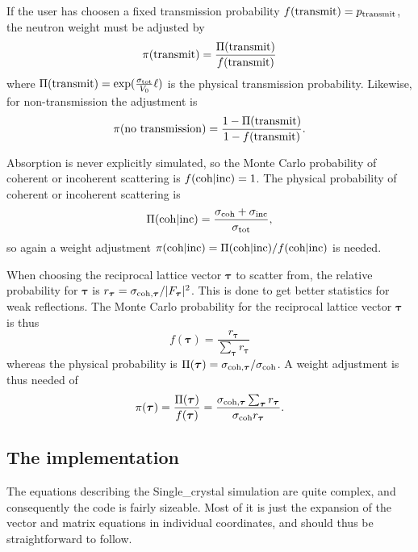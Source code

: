 If the user has choosen a fixed transmission probability $f({\rm
  transmit}) = p_{\rm transmit}$, the neutron weight must be adjusted by
$$ \pi({\rm transmit}) = \frac{\Pi({\rm transmit})}{f({\rm transmit})}
$$
where $\Pi({\rm transmit}) = \exp(\frac{\sigma_{\rm tot}}{V_0}\ell)$ is
the physical transmission probability. Likewise, for non-transmission
the adjustment is
$$ \pi({\rm no~transmission}) = \frac{1-\Pi({\rm transmit})}{1-f({\rm transmit})}.
$$

Absorption is never explicitly simulated, so the Monte Carlo probability
of coherent or incoherent scattering is $f({\rm coh}|{\rm inc}) =
1$. The physical probability of coherent or incoherent scattering is
$$ \Pi({\rm coh}|{\rm inc}) = \frac{\sigma_{\rm coh} + \sigma_{\rm
    inc}}{\sigma_{\rm tot}}, $$
so again a weight adjustment $\pi({\rm coh}|{\rm inc}) = \Pi({\rm
    coh}|{\rm inc})/f({\rm coh}|{\rm inc})$ is needed.

When choosing the reciprocal lattice vector $\boldsymbol{\tau}$ to
scatter from, the relative probability for $\boldsymbol{\tau}$ is
$r_{\boldsymbol{\tau}} = \sigma_{{\rm
    coh},\boldsymbol{\tau}}/|F_{\boldsymbol{\tau}}|^2$. This is done to
get better statistics for weak reflections. The Monte Carlo probability
for the reciprocal lattice vector $\boldsymbol{\tau}$ is thus
$$ f(\boldsymbol{\tau}) =
\frac{r_{\boldsymbol{\tau}}}{\sum_{\boldsymbol{\tau}} r_{\boldsymbol{\tau}}}
$$
whereas the physical probability is $\Pi(\boldsymbol{\tau}) = \sigma_{{\rm
    coh},\boldsymbol{\tau}}/\sigma_{\rm coh}$. A weight adjustment is
thus needed of
$$
\pi(\boldsymbol{\tau}) =
 \frac{\Pi(\boldsymbol{\tau})}{f(\boldsymbol{\tau})} =
 \frac{\sigma_{{\rm coh},\boldsymbol{\tau}}
  \sum_{\boldsymbol{\tau}} r_{\boldsymbol{\tau}}}{\sigma_{\rm coh}
  r_{\boldsymbol{\tau}}}.$$

\subsection{The implementation}


The equations describing the Single\_crystal simulation are quite
complex, and consequently the code is fairly sizeable. Most of it is
just the expansion of the vector and matrix equations in individual
coordinates, and should thus be straightforward to follow.

